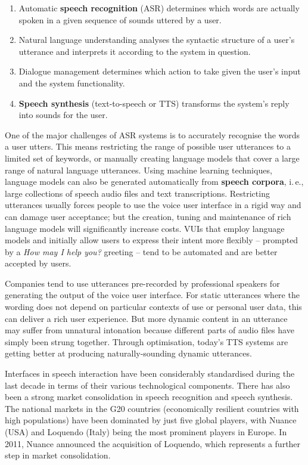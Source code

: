 \begin{multicols}{2}
\begin{enumerate}
\item Automatic \textbf{speech recognition} (ASR) determines which words are actually spoken in a given sequence of sounds uttered by a user.  
\item Natural language understanding analyses the syntactic structure of a user’s utterance and interprets it according to the system in question.
\item Dialogue management determines which action to take given the user's input and the system functionality.   
\item \textbf{Speech synthesis} (text-to-speech or TTS) transforms the system’s reply into sounds for the user.
\end{enumerate}

One of the major challenges of ASR systems is to accurately recognise the words a user utters. This means restricting the range of possible user utterances to a limited set of keywords, or manually creating language models that cover a large range of natural language utterances. Using machine learning techniques, language models can also be generated automatically from \textbf{speech corpora}, i.\,e., large collections of speech audio files and text transcriptions. Restricting utterances usually forces people to use the voice user interface in a rigid way and can damage user acceptance; but the creation, tuning and maintenance of rich language models will significantly increase costs. VUIs that employ language models and initially allow users to express their intent more flexibly -- prompted by a \textit{How may I help you?} greeting -- tend to be automated and are better accepted by users.


Companies tend to use utterances pre-recorded by professional speakers for generating the output of the voice user interface. For static utterances where the wording does not depend on particular contexts of use or personal user data, this can deliver a rich user experience. But more dynamic content in an utterance may suffer from unnatural intonation because different parts of audio files have simply been strung together. Through optimisation, today’s TTS systems are getting better at producing naturally-sounding dynamic utterances.

Interfaces in speech interaction have been considerably standardised during the last decade in terms of their various technological components. There has also been a strong market consolidation in speech recognition and speech synthesis. The national markets in the G20 countries (economically resilient countries with high populations) have been dominated by just five global players, with Nuance (USA) and Loquendo (Italy) being the most prominent players in Europe. In 2011, Nuance announced the acquisition of Loquendo, which represents a further step in market consolidation.


\end{multicols}
